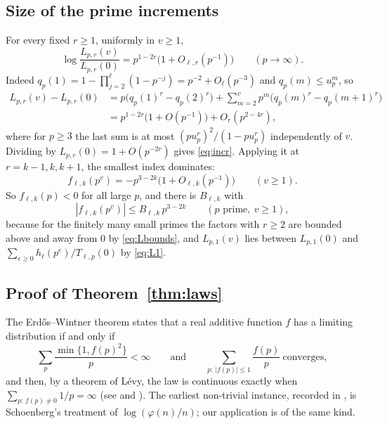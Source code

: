 \documentclass[11pt,a4paper]{article}
\theoremstyle{remark}
\numberwithin{equation}{section}
\begin{document}
\subsection{Size of the prime increments}
For every fixed $r\ge1$, uniformly in $v\ge1$,
\begin{equation}\label{eq:incr}
\log\frac{L_{p,r}(v)}{L_{p,r}(0)}=p^{1-2r}\bigl(1+O_{\ell,r}(p^{-1})\bigr)\qquad(p\to\infty).
\end{equation}
Indeed $q_p(1)=1-\prod_{j=2}^{\ell}(1-p^{-j})=p^{-2}+O_\ell(p^{-3})$ and $q_p(m)\le u_p^m$, so
\[
\begin{aligned}L_{p,r}(v)-L_{p,r}(0)&=p\bigl(q_p(1)^r-q_p(2)^r\bigr)+\sum_{m=2}^vp^m\bigl(q_p(m)^r-q_p(m+1)^r\bigr)\\&=p^{1-2r}\bigl(1+O(p^{-1})\bigr)+O_r(p^{2-4r}),\end{aligned}
\]
where for $p\ge3$ the last sum is at most $(pu_p^r)^2/(1-pu_p^r)$ independently of $v$. Dividing by $L_{p,r}(0)=1+O(p^{-2r})$ gives \eqref{eq:incr}. Applying it at $r=k-1,k,k+1$, the smallest index dominates:
\begin{equation}\label{eq:fp}
f_{\ell,k}(p^v)=-p^{3-2k}\bigl(1+O_{\ell,k}(p^{-1})\bigr)\qquad(v\ge1).
\end{equation}
So $f_{\ell,k}(p)<0$ for all large $p$, and there is $B_{\ell,k}$ with
\begin{equation}\label{eq:fbound}
|f_{\ell,k}(p^v)|\le B_{\ell,k}\,p^{3-2k}\qquad(p\text{ prime},\ v\ge1),
\end{equation}
because for the finitely many small primes the factors with $r\ge2$ are bounded above and away from $0$ by \eqref{eq:Lbounds}, and $L_{p,1}(v)$ lies between $L_{p,1}(0)$ and $\sum_{e\ge0}h_\ell(p^e)/T_{\ell,p}(0)$ by \eqref{eq:L1}.

\subsection{Proof of Theorem~\ref{thm:laws}}
The Erd\H{o}s--Wintner theorem \cite{ErdosWintner} states that a real additive function $f$ has a limiting distribution if and only if
\begin{equation}\label{eq:EW}
\sum_p\frac{\min\{1,f(p)^2\}}p<\infty\qquad\text{and}\qquad\sum_{p:\,|f(p)|\le1}\frac{f(p)}p\ \text{converges},
\end{equation}
and then, by a theorem of L\'evy, the law is continuous exactly when $\sum_{p:\,f(p)\ne0}1/p=\infty$ (see \cite[(1.1)--(1.2)]{TenenbaumVerwee} and \cite[Sections~8 and~13]{ErdosWintner}). The earliest non-trivial instance, recorded in \cite{ErdosWintner}, is Schoenberg's treatment of $\log(\varphi(n)/n)$; our application is of the same kind.
\end{document}

